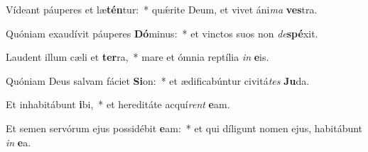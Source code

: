 \item Vídeant páuperes et læ\textbf{tén}tur:~* quǽrite Deum, et vivet áni\textit{ma} \textbf{ves}tra.
\item Quóniam exaudívit páuperes \textbf{Dó}minus:~* et vinctos suos non \textit{de}\textbf{spé}xit.
\item Laudent illum cæli et \textbf{ter}ra,~* mare et ómnia reptília \textit{in} \textbf{e}is.
\item Quóniam Deus salvam fáciet \textbf{Si}on:~* et ædificabúntur civitá\textit{tes} \textbf{Ju}da.
\item Et inhabitábunt \textbf{i}bi,~* et hereditáte acquí\textit{rent} \textbf{e}am.
\item Et semen servórum ejus possidébit \textbf{e}am:~* et qui díligunt nomen ejus, habitábunt \textit{in} \textbf{e}a.
